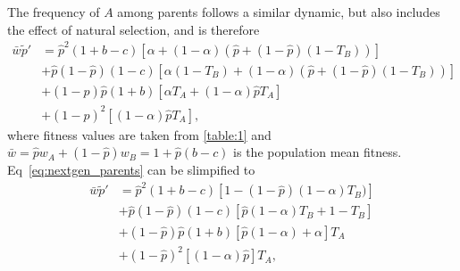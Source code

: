 \documentclass[12pt]{extarticle}
\begin{document}
The frequency of $A$ among parents follows a similar dynamic, but also includes the effect of natural selection, and is therefore
\begin{equation}\label{eq:nextgen_parents}
\begin{aligned}
\bar{w} \tilde{p}'
& = \hat{p}^2 (1+b-c) [\alpha + (1-\alpha)(\hat{p} + (1-\hat{p})(1-T_B))] \\
& + \hat{p}(1-\hat{p}) (1-c) [\alpha(1-T_B) + (1-\alpha)(\hat{p} + (1-\hat{p})(1-T_B))] \\
& + (1-\hat{p})\hat{p} (1+b) [\alpha T_A + (1-\alpha) \hat{p} T_A ] \\
& + (1-\hat{p})^2 [(1-\alpha) \hat{p} T_A],
\end{aligned}
\end{equation}
where fitness values are taken from \autoref{table:1} and $\bar{w} = \hat{p} w_A + (1-\hat{p}) w_B = 1 + \hat{p}(b-c)$ is the population mean fitness.
Eq~\ref{eq:nextgen_parents} can be slimpified to
\begin{equation}\label{eq:nextgen_parents_simplified}
\begin{aligned}
\bar{w} \tilde{p}'
& = \hat{p}^2 (1+b-c) [1-(1-\hat{p})(1-\alpha)T_B)] \\
& + \hat{p}(1-\hat{p}) (1-c) [\hat{p}(1-\alpha)T_B+1-T_B] \\
& + (1-\hat{p})\hat{p} (1+b) [\hat{p}(1-\alpha) + \alpha]T_A \\
& + (1-\hat{p})^2 [(1-\alpha) \hat{p}]T_A,
\end{aligned}
\end{equation}
\end{document}

